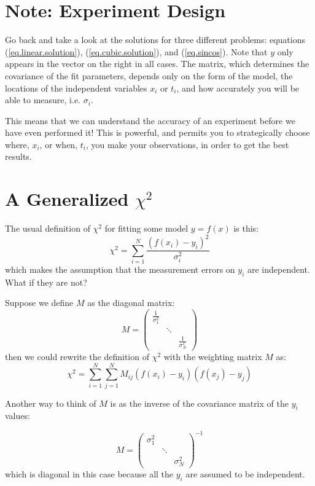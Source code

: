 \documentclass[letterpaper,12pt]{article}
\newcommand{\myMatrix}[1]{\bm{\mathit{#1}}}
\begin{document}
\section{Note: Experiment Design}

Go back and take a look at the solutions for three different problems: equations (\ref{eq.linear.solution}), (\ref{eq.cubic.solution}), and (\ref{eq.sincos}). Note that $y$ only appears in the vector on the right in all cases. The matrix, which determines the covariance of the fit parameters, depends only on the form of the model, the locations of the independent variables $x_i$ or $t_i$, and how accurately you will be able to measure, i.e. $\sigma_i$.

This means that we can understand the accuracy of an experiment before we have even performed it! This is powerful, and permits you to strategically choose where, $x_i$, or when, $t_i$, you make your observations, in order to get the best results.

\section{A Generalized $\chi^2$}
The usual definition of $\chi^2$ for fitting some model $y=f(x)$ is this:
\begin{equation}
\chi^2=\sum_{i=1}^N \frac{(f(x_i) - y_i)^2}{\sigma_i^2}
\end{equation}
which makes the assumption that the measurement errors on $y_i$ are independent. What if they are not?

Suppose we define $\myMatrix{M}$ as the diagonal matrix:
\begin{equation}
\myMatrix{M}=
\begin{pmatrix}
\frac{1}{\sigma_1^2} & & \\
& \ddots & \\
& & \frac{1}{\sigma_N^2}
\end{pmatrix}
\end{equation}
then we could rewrite the definition of $\chi^2$ with the weighting matrix $\myMatrix{M}$ as:
\begin{equation} \label{eq.general.chi.square}
\chi^2=\sum_{i=1}^N \sum_{j=1}^N \myMatrix{M}_{ij}(f(x_i) - y_i)(f(x_j) - y_j)
\end{equation}

Another way to think of $\myMatrix{M}$ is as the inverse of the covariance matrix of the $y_i$ values:

\begin{equation}
\myMatrix{M}=
\begin{pmatrix}
\sigma_1^2 & & \\
& \ddots & \\
& & \sigma_N^2
\end{pmatrix}^{-1}
\end{equation}
which is diagonal in this case because all the $y_i$ are assumed to be independent.
\end{document}
